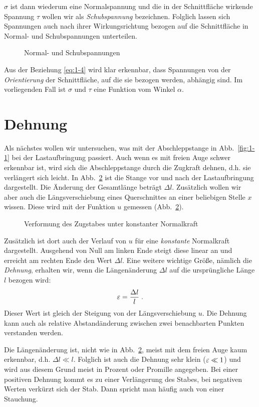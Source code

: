 $\sigma$ ist dann wiederum eine Normalspannung und die in der Schnittfläche wirkende Spannung $\tau$ wollen wir als \emph{Schubspannung} bezeichnen.
Folglich lassen sich Spannungen auch nach ihrer Wirkungsrichtung bezogen auf die Schnittfläche in Normal- und Schubspannungen unterteilen.
%
\begin{figure}[h!]
	\centering
	
	\caption{Normal- und Schubspannungen}
	\label{fig:1-4}
\end{figure}
%
Aus der Beziehung \eqref{eq:1-4} wird klar erkennbar, dass Spannungen von der \emph{Orientierung} der Schnittfläche, auf die sie bezogen werden, abhängig sind.
Im vorliegenden Fall ist $\sigma$ und $\tau$ eine Funktion vom Winkel $\alpha$.

\section{Dehnung}

Als nächstes wollen wir untersuchen, was mit der Abschleppstange in Abb.~\ref{fig:1-1} bei der Lastaufbringung passiert.
Auch wenn es mit freien Auge schwer erkennbar ist, wird sich die Abschleppstange durch die Zugkraft dehnen, d.h. sie verlängert sich leicht.
In Abb.~\ref{fig:1-5} ist die Stange vor und nach der Lastaufbringung dargestellt.
Die Änderung der Gesamtlänge beträgt $\Delta l$.
Zusätzlich wollen wir aber auch die Längsverschiebung eines  Querschnittes an einer beliebigen Stelle $x$ wissen.
Diese wird mit der Funktion $u$ gemessen (Abb.~\ref{fig:1-5}). 
%
\begin{figure}[h!]
	\centering
	
	\caption{Verformung des Zugstabes unter konstanter Normalkraft}
	\label{fig:1-5}
\end{figure}
%
Zusätzlich ist dort auch der Verlauf von $u$ für eine \emph{konstante} Normalkraft dargestellt.
Ausgehend von Null am linken Ende steigt diese linear an und erreicht am rechten Ende den Wert $\Delta l$.
Eine weitere wichtige Größe, nämlich die \emph{Dehnung}, erhalten wir, wenn die Längenänderung $\Delta l$ auf die ursprüngliche Länge $l$ bezogen wird: 
%
\begin{equation}
\varepsilon =  \dfrac{\Delta l}{l} \; .
\label{eq:1-5}
\end{equation}
%
Dieser Wert ist gleich der Steigung von der Längsverschiebung $u$.
Die Dehnung kann auch als relative Abstandänderung zwischen zwei benachbarten Punkten verstanden werden. 

Die Längenänderung ist, nicht wie in Abb.~\ref{fig:1-5}, meist mit dem freien Auge kaum erkennbar, d.h. $\Delta l \ll l$.
Folglich ist auch die Dehnung sehr klein ($\varepsilon\ll 1$) und wird aus diesem Grund meist in Prozent oder Promille angegeben.
Bei einer positiven Dehnung kommt es zu einer Verlängerung des Stabes, bei negativen Werten verkürzt sich der Stab.
Dann spricht man häufig auch von einer Stauchung.

